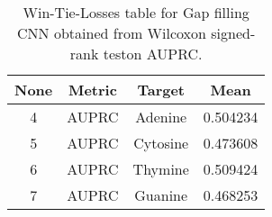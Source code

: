 \begin{table}[H]
\centering
\begin{tabular}{|c|c|c|c|}

 \textbf{None} & \textbf{Metric} & \textbf{Target} &  \textbf{Mean} \\
\hline

             4 &           AUPRC &         Adenine &       0.504234 \\
\hline
             5 &           AUPRC &        Cytosine &       0.473608 \\
\hline
             6 &           AUPRC &         Thymine &       0.509424 \\
\hline
             7 &           AUPRC &         Guanine &       0.468253 \\
\hline

\end{tabular}
\caption{Win-Tie-Losses table for Gap filling CNN obtained from Wilcoxon signed-rank teston AUPRC.}
\label{tab:gap_filling_cnn_nucleotides_means}
\end{table}